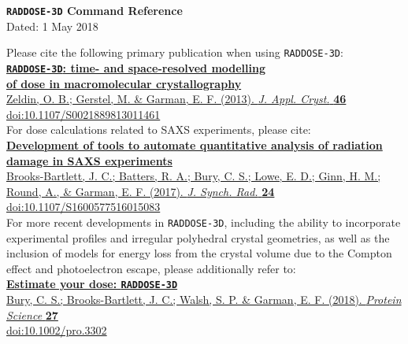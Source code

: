 \documentclass[a4paper]{article}
\newcommand{\RD}{\texttt{RADDOSE-3D}\xspace}
\begin{document}
\begin{center}
\noindent \textsf{\huge\textbf{\RD Command Reference}}\\[0.3em]
Dated: 1 May 2018\\[3.5em]
\end{center}

\noindent
Please cite the following primary publication when using \RD:\\[0.4em]
\href{http://dx.doi.org/10.1107/S0021889813011461}{\large\textbf{\RD: time- and space-resolved modelling\\[0.0em] of dose in macromolecular crystallography}}\\[0.1em]
\href{http://dx.doi.org/10.1107/S0021889813011461}{Zeldin, O. B.; Gerstel, M. \& Garman, E. F. (2013). \textit{J. Appl. Cryst.} \textbf{46} %
}\\[0.1em]
\href{http://dx.doi.org/10.1107/S0021889813011461}{doi:10.1107/S0021889813011461}
\\[1.5em]
\noindent
For dose calculations related to SAXS experiments, please cite:\\[0.4em]
\href{https://doi.org/10.1107/S1600577516015083}{\large\textbf{Development of tools to automate quantitative analysis of radiation damage in SAXS experiments}}\\[0.1em]
\href{https://doi.org/10.1107/S1600577516015083}{Brooks-Bartlett, J. C.; Batters, R. A.; Bury, C. S.; Lowe, E. D.; Ginn, H. M.; Round, A., \& Garman, E. F. (2017). \textit{J. Synch. Rad.} \textbf{24} %
}\\[0.1em]
\href{https://doi.org/10.1107/S1600577516015083}{doi:10.1107/S1600577516015083}
\\[1.5em]
\noindent
For more recent developments in \RD, including the ability to incorporate experimental profiles and irregular polyhedral crystal geometries, as well as the inclusion of  models for energy loss from the crystal volume due to the Compton effect and photoelectron escape, please additionally refer to:\\[0.4em]
\href{https://doi.org/10.1002/pro.3302}{\large\textbf{Estimate your dose: \RD}}\\[0.1em]
\href{https://doi.org/10.1002/pro.3302}{Bury, C. S.; Brooks-Bartlett, J. C.; Walsh, S. P. \& Garman, E. F. (2018). \textit{Protein Science} \textbf{27} %
}\\[0.1em]
\href{https://doi.org/10.1002/pro.3302}{doi:10.1002/pro.3302}
\\[1.5em]
\end{document}
